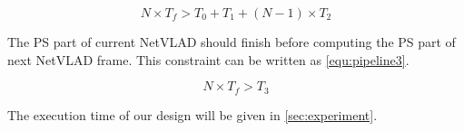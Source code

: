 \begin{equation}
    N \times T_{f} > T_{0} + T_{1} + (N-1) \times T_{2}
    \label{equ:pipeline2}
\end{equation}

The PS part of current NetVLAD should finish before computing the PS part of next NetVLAD frame. This constraint can be written as \cref{equ:pipeline3}.


\begin{equation}
    N \times T_{f} > T_{3}
    \label{equ:pipeline3}
\end{equation}

The execution time of our design will be given in \cref{sec:experiment}.

